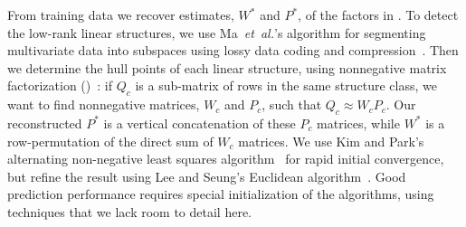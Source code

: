 \documentclass{acm_proc_article-sp}
\begin{document}

From training data we recover estimates, $W^*$ and $P^*$, of the factors in .
To detect the low-rank linear structures, we use Ma~\emph{et~al.}'s algorithm for segmenting multivariate data into subspaces using lossy data coding and compression~\cite{Ma07}.
Then we determine the hull points of each linear structure, using nonnegative matrix factorization ()~\cite{Lee01,Kim08:anls}:
if $Q_c$ is a sub-matrix of rows in the same structure class, we want to find nonnegative matrices, $W_c$ and $P_c$, such that $Q_c \approx W_c P_c$.
Our reconstructed $P^*$ is a vertical concatenation of these $P_c$ matrices, while $W^*$ is a row-permutation of the direct sum of $W_c$ matrices.
We use Kim and Park's alternating non-negative least squares algorithm~\cite{Kim08:anls} for rapid initial convergence, but refine the result using Lee and Seung's Euclidean algorithm~\cite{Lee01}.
Good prediction performance requires special initialization of the  algorithms, using techniques that we lack room to detail here.
\end{document}
